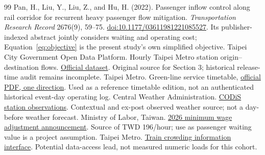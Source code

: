 \begin{thebibliography}{99}
 Pan, H., Liu, Y., Liu, Z., and Hu, H. (2022). Passenger inflow control along rail corridor for recurrent heavy passenger flow mitigation. \emph{Transportation Research Record} 2676(9), 59--75. \href{https://doi.org/10.1177/03611981221085527}{doi:10.1177/03611981221085527}. Its publisher-indexed abstract jointly considers waiting and operating cost; Equation~\eqref{eq:objective} is the present study's own simplified objective.
 Taipei City Government Open Data Platform. Hourly Taipei Metro station origin--destination flows. \href{https://data.taipei/dataset/detail?id=63f31c7e-7fc3-418b-bd82-b95158755b4d}{Official dataset}. Original source for Section 3; historical release-time audit remains incomplete.
 Taipei Metro. Green-line service timetable, \href{https://web.metro.taipei/img/ALL/timetables/105a.PDF}{official PDF, one direction}. Used as a reference timetable edition, not an authenticated historical event-day operating log.
 Central Weather Administration. \href{https://codis.cwa.gov.tw/StationData}{CODiS station observations}. Contextual and ex-post observed weather source; not a day-before weather forecast.
 Ministry of Labor, Taiwan. \href{https://english.mol.gov.tw/21139/40790/87087/}{2026 minimum wage adjustment announcement}. Source of TWD 196/hour; use as passenger waiting value is a project assumption.
 Taipei Metro. \href{https://www.metro.taipei/cp.aspx?n=BDEB860F2BE3E249}{Train crowding information interface}. Potential data-access lead, not measured numeric loads for this cohort.
\end{thebibliography}
\endgroup
